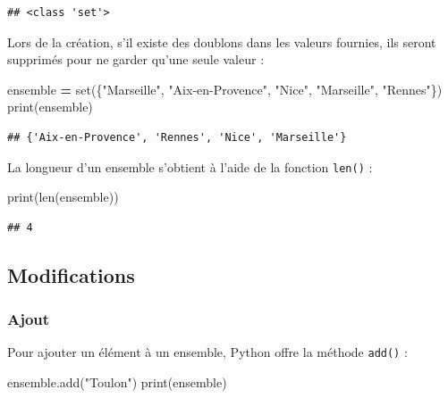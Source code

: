 \documentclass[12pt,]{book}
\newenvironment{Shaded}{\begin{snugshade}}{\end{snugshade}}
\newcommand{\StringTok}[1]{\textcolor[rgb]{0.31,0.60,0.02}{#1}}
\newcommand{\OperatorTok}[1]{\textcolor[rgb]{0.81,0.36,0.00}{\textbf{#1}}}
\newcommand{\BuiltInTok}[1]{#1}
\newcommand{\NormalTok}[1]{#1}
\numberwithin{equation}{section}
\numberwithin{countremarque}{section}
\begin{document}
\begin{lstlisting}
## <class 'set'>
\end{lstlisting}

Lors de la création, s'il existe des doublons dans les valeurs fournies,
ils seront supprimés pour ne garder qu'une seule valeur :

\begin{Shaded}
\begin{Highlighting}[]
\NormalTok{ensemble }\OperatorTok{=} \BuiltInTok{set}\NormalTok{(\{}\StringTok{"Marseille"}\NormalTok{, }\StringTok{"Aix-en-Provence"}\NormalTok{, }\StringTok{"Nice"}\NormalTok{, }\StringTok{"Marseille"}\NormalTok{, }\StringTok{"Rennes"}\NormalTok{\})}
\BuiltInTok{print}\NormalTok{(ensemble)}
\end{Highlighting}
\end{Shaded}

\begin{lstlisting}
## {'Aix-en-Provence', 'Rennes', 'Nice', 'Marseille'}
\end{lstlisting}

La longueur d'un ensemble s'obtient à l'aide de la fonction
\texttt{len()} :

\begin{Shaded}
\begin{Highlighting}[]
\BuiltInTok{print}\NormalTok{(}\BuiltInTok{len}\NormalTok{(ensemble))}
\end{Highlighting}
\end{Shaded}

\begin{lstlisting}
## 4
\end{lstlisting}

\subsection{Modifications}\label{modifications}

\subsubsection{Ajout}\label{ajout}

Pour ajouter un élément à un ensemble, Python offre la méthode
\texttt{add()} :

\begin{Shaded}
\begin{Highlighting}[]
\NormalTok{ensemble.add(}\StringTok{"Toulon"}\NormalTok{)}
\BuiltInTok{print}\NormalTok{(ensemble)}
\end{Highlighting}
\end{Shaded}
\end{document}
